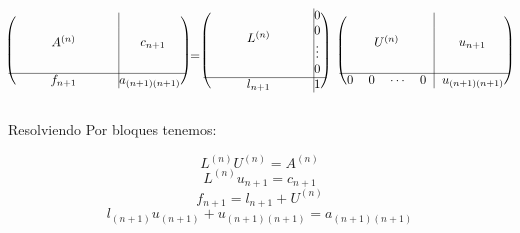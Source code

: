 \begin{itemize}
  \[
  \begin{blockarray}{cccc|c}
    \begin{block}{(cccc@{\hspace*{45pt}}|c@{\hspace*{5pt}})}
    \BAmulticolumn{4}{c|}{\multirow{4}{*}{$A^{(n)}$}}&\BAmulticolumn{1}{c}{\multirow{4}{*}{$c_{n+1}$}}\\
	&&&&\\
    &&&&\\
    &&&&\\
    \cline{1-5}%
    \BAmulticolumn{4}{c|}{f_{n+1}}&a_{(n+1)(n+1)} \\
    \end{block}
  \end{blockarray}
  =
  \begin{blockarray}{cccc|c}
    \begin{block}{(cccc@{\hspace*{45pt}}|c@{\hspace*{5pt}})}
    \BAmulticolumn{4}{c|}{\multirow{4}{*}{$L^{(n)}$}}&0 \\
	&&&& 0\\
    &&&& \vdots\\
    &&&& 0\\
    \cline{1-5}%
    \BAmulticolumn{4}{c|}{l_{n+1}}& 1 \\
    \end{block}
  \end{blockarray}
  \hspace{1em}
  \begin{blockarray}{cccc|c}
    \begin{block}{(cccc|c@{\hspace*{5pt}})}
    \BAmulticolumn{4}{c|}{\multirow{4}{*}{$U^{(n)}$}}&\BAmulticolumn{1}{c}{\multirow{4}{*}{$u_{n+1}$}}\\
	&&&&\\
    &&&&\\
    &&&&\\
    \cline{1-5}%
    0 & 0 & \cdots & 0 & u_{(n+1)(n+1)} \\
    \end{block}
  \end{blockarray}
  \]
  
  Resolviendo Por bloques tenemos:
  
  \begin{equation} \label{demo:Block1}
  	L^{(n)} U^{(n)} = A^{(n)} 
  \end{equation} 
  \begin{equation} \label{demo:Block2}
	L^{(n)} u_{n+1} = c_{n+1} 
  \end{equation}
  \begin{equation} \label{demo:Block3}
	f_{n+1} = l_{n+1} + U^{(n)}
  \end{equation}
  \begin{equation} \label{demo:Block4}
	l_{(n+1)} u_{(n+1)} + u_{(n+1)(n+1)} = a_{(n+1)(n+1)}
  \end{equation}
  

\end{itemize}

